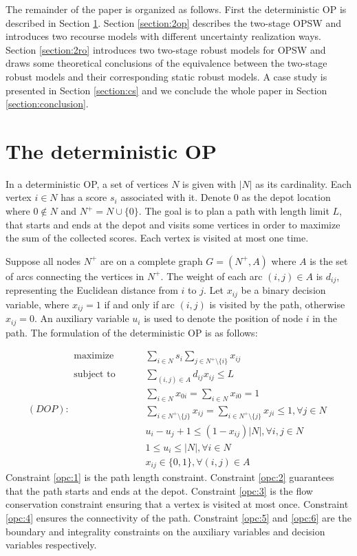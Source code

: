 \documentclass[preprint,review,10pt,round,authoryear]{elsarticle}\usepackage[]{graphicx}\usepackage[]{color}
\theoremstyle{plain}
\theoremstyle{definition}
\theoremstyle{remark}
\begin{document}
The remainder of the paper is organized as follows. First the deterministic OP is described in Section \ref{section:op}. Section \ref{section:2op} describes the two-stage OPSW and introduces two recourse models with different uncertainty realization ways. Section \ref{section:2ro} introduces two two-stage robust models for OPSW and draws some theoretical conclusions of the equivalence between the two-stage robust models and their corresponding static robust models. A case study is presented in Section \ref{section:cs} and we conclude the whole paper in Section \ref{section:conclusion}.

\section{The deterministic OP}
\label{section:op}
In a deterministic OP, a set of vertices $N$ is given with $|N|$ as its cardinality. Each vertex $i\in N$ has a score $s_i$ associated with it. Denote $0$ as the depot location where $0\notin N$ and $N^+=N\cup\{0\}$. The goal is to plan a path with length limit $L$, that starts and ends at the depot and visits some vertices in order to maximize the sum of the collected scores. Each vertex is visited at most one time.

Suppose all nodes $N^+$ are on a complete graph $G=(N^+,A)$ where $A$ is the set of arcs connecting the vertices in $N^+$. The weight of each arc $(i,j)\in A$ is $d_{ij}$, representing the Euclidean distance from $i$ to $j$. Let $x_{ij}$ be a binary decision variable, where $x_{ij}=1$ if and only if arc $(i,j)$ is visited by the path, otherwise $x_{ij}=0$. An auxiliary variable $u_i$ is used to denote the position of node $i$ in the path. The formulation of the deterministic OP is as follows:

\begin{subequations}\label{eq:op1}
(DOP):\begin{alignat}{2}
    \text{maximize}\qquad & \sum_{i\in N}s_i\sum_{j\in N^+\setminus\{i\}}x_{ij}\\
    \text{subject to }\qquad & \sum_{(i,j)\in A}d_{ij} x_{ij} \leq L\label{opc:1}\\
    & \sum_{i\in N}x_{0i}=\sum_{i\in N}x_{i0}=1\label{opc:2}\\
    & \sum_{i\in N^+\setminus\{j\}}x_{ij}=\sum_{i\in N^+\setminus\{j\}}x_{ji}\leq1, \forall j\in N\label{opc:3}\\
    & u_i-u_j+1\leq(1-x_{ij})|N|, \forall i,j\in N\label{opc:4}\\
    & 1\leq u_i\leq|N|, \forall i\in N\label{opc:5}\\
    & x_{ij}\in \{0,1\}, \forall (i,j)\in A\label{opc:6}
    \end{alignat}
  \end{subequations}
Constraint \eqref{opc:1} is the path length constraint. Constraint \eqref{opc:2} guarantees that the path starts and ends at the depot. Constraint \eqref{opc:3} is the flow conservation constraint ensuring that a vertex is visited at most once. Constraint \eqref{opc:4} ensures the connectivity of the path. Constraint \eqref{opc:5} and \eqref{opc:6} are the boundary and integrality constraints on the auxiliary variables and decision variables respectively. 
\end{document}
